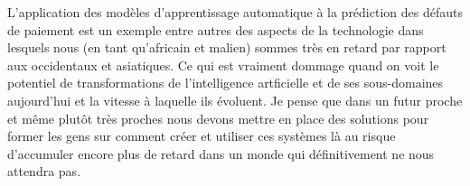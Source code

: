L'application des modèles d'apprentissage automatique à la prédiction des défauts de paiement est un exemple entre autres des aspects de la technologie dans lesquels nous (en tant qu'africain et malien) sommes très en retard par rapport aux occidentaux et asiatiques. Ce qui est vraiment dommage quand on voit le potentiel de transformations de l'intelligence artficielle et de ses sous-domaines aujourd'hui et la vitesse à laquelle ils évoluent. Je pense que dans un futur proche et même plutôt très proches nous devons mettre en place des solutions pour former les gens sur comment créer et utiliser ces systèmes là au risque d'accumuler encore plus de retard dans un monde qui définitivement ne nous attendra pas.